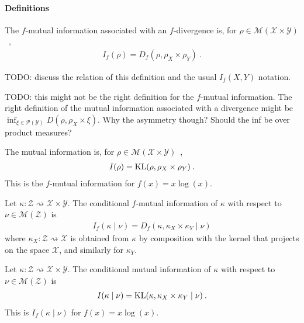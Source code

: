 
\paragraph{Definitions}

\begin{definition}
  \label{def:fMutualInfo}
  The $f$-mutual information associated with an $f$-divergence is, for $\rho \in \mathcal M(\mathcal X \times \mathcal Y)$~,
  \begin{align*}
  I_f(\rho) = D_f(\rho, \rho_X \times \rho_Y) \: .
  \end{align*}
\end{definition}

TODO: discuss the relation of this definition and the usual $I_f(X, Y)$ notation.

TODO: this might not be the right definition for the $f$-mutual information. The right definition of the mutual information associated with a divergence might be $\inf_{\xi \in \mathcal P(\mathcal Y)} D(\rho, \rho_X \times \xi)$. Why the asymmetry though? Should the inf be over product measures?


\begin{definition}
  \label{def:mutualInfo}
  The mutual information is, for $\rho \in \mathcal M(\mathcal X \times \mathcal Y)$~,
  \begin{align*}
  I(\rho) = \operatorname{KL}(\rho, \rho_X \times \rho_Y) \: .
  \end{align*}
  This is the $f$-mutual information for $f(x) = x \log(x)$.
\end{definition}


\begin{definition}
  \label{def:condFMutualInfo}
  Let $\kappa : \mathcal Z \rightsquigarrow \mathcal X \times \mathcal Y$. The conditional $f$-mutual information of $\kappa$ with respect to $\nu \in \mathcal M(\mathcal Z)$ is
  \begin{align*}
  I_f(\kappa \mid \nu) = D_f(\kappa, \kappa_X \times \kappa_Y \mid \nu)
  \end{align*}
  where $\kappa_X : \mathcal Z \rightsquigarrow \mathcal X$ is obtained from $\kappa$ by composition with the kernel that projects on the space $\mathcal X$, and similarly for $\kappa_Y$.
\end{definition}


\begin{definition}
  \label{def:condMutualInfo}
  Let $\kappa : \mathcal Z \rightsquigarrow \mathcal X \times \mathcal Y$. The conditional mutual information of $\kappa$ with respect to $\nu \in \mathcal M(\mathcal Z)$ is
  \begin{align*}
  I(\kappa \mid \nu) = \operatorname{KL}(\kappa, \kappa_X \times \kappa_Y \mid \nu) \: .
  \end{align*}
  This is $I_f(\kappa \mid \nu)$ for $f(x) = x \log(x)$.
\end{definition}


